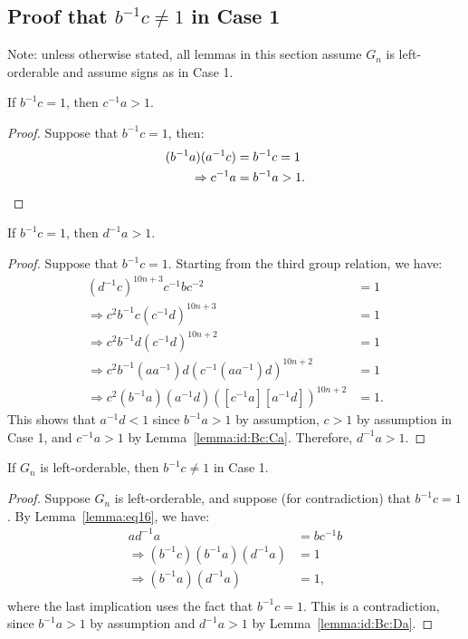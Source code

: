 \subsection{Proof that $b^{-1}c\neq{}1$ in Case 1}
\noindent{}Note: unless otherwise stated, all lemmas in this section assume $G_n$ is left-orderable and assume signs as in Case 1.

\begin{lemma} If $b^{-1}c=1$, then $c^{-1}a>1$.
\label{lemma:id:Bc:Ca}
\end{lemma}
\begin{proof} Suppose that $b^{-1}c=1$, then:
\begin{align*}
(b^{-1}a)(a^{-1}c)&=b^{-1}c=1\\
\Rightarrow{}c^{-1}a&=b^{-1}a>1.\qedhere
\end{align*}
\end{proof}

\begin{lemma} If $b^{-1}c=1$, then $d^{-1}a>1$.
\label{lemma:id:Bc:Da}
\end{lemma}
\begin{proof} Suppose that $b^{-1}c=1$. Starting from the third group relation, we have:
\begin{align*}
(d^{-1}c)^{10n+3}c^{-1}bc^{-2}&=1\\
\Rightarrow{}c^{2}b^{-1}c(c^{-1}d)^{10n+3}&=1\\
\Rightarrow{}c^{2}b^{-1}d(c^{-1}d)^{10n+2}&=1\\
\Rightarrow{}c^{2}b^{-1}(aa^{-1})d(c^{-1}(aa^{-1})d)^{10n+2}&=1\\
\Rightarrow{}c^{2}(b^{-1}a)(a^{-1}d)([c^{-1}a][a^{-1}d])^{10n+2}&=1.
\end{align*}
This shows that $a^{-1}d<1$ since $b^{-1}a>1$ by assumption, $c>1$ by assumption in Case 1, and $c^{-1}a>1$ by Lemma~\ref{lemma:id:Bc:Ca}. Therefore, $d^{-1}a>1$.
\end{proof}

\begin{proposition} If $G_n$ is left-orderable, then $b^{-1}c\neq{}1$ in Case 1.
\label{proposition:id:Bc}
\label{proposition:id:cB}
\end{proposition}
\begin{proof} Suppose $G_n$ is left-orderable, and suppose (for contradiction) that $b^{-1}c=1$. By Lemma~\ref{lemma:eq16}, we have:
\begin{align*}
ad^{-1}a&=bc^{-1}b\\
\Rightarrow{}(b^{-1}c)(b^{-1}a)(d^{-1}a)&=1\\
\Rightarrow{}(b^{-1}a)(d^{-1}a)&=1,\\
\end{align*}
where the last implication uses the fact that $b^{-1}c=1$. This is a contradiction, since $b^{-1}a>1$ by assumption and $d^{-1}a>1$ by Lemma~\ref{lemma:id:Bc:Da}.
\end{proof}
$\;$
